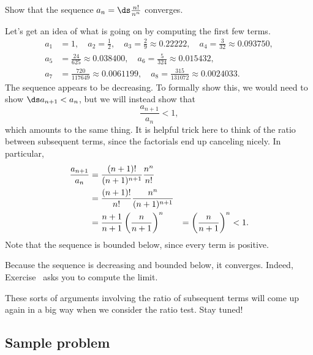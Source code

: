 \documentclass{ximera}
\begin{document}
\begin{example}
Show that the sequence $a_n = \ds\frac{n!}{n^n}$ converges.
\end{example}

\begin{solution}
  Let's get an idea of what is going on by computing the first few terms.
\begin{align*}
a_1&= 1,\quad a_2= \frac{1}{2},\quad a_3= \frac{2}{9} \approx 0.22222,\quad a_4= \frac{3}{32} \approx 0.093750, \\
a_5&= \frac{24}{625} \approx 0.038400, \quad a_6= \frac{5}{324} \approx 0.015432, \\
a_7&= \frac{720}{117649} \approx 0.0061199,\quad a_8= \frac{315}{131072} \approx 0.0024033.
\end{align*}
  The sequence appears to be decreasing.  To formally show this, we would need to show $\ds a_{n+1}< a_n$, but we will instead show that
$$
\frac{a_{n+1}}{a_n} < 1,
$$
which amounts to the same thing.  It is helpful trick here to think of
the ratio between subsequent terms, since the factorials end up
canceling nicely.  In particular,
\begin{align*}
  {a_{n+1}\over a_n} &= {(n+1)!\over (n+1)^{n+1}}{n^n\over n!} \\
  &= {(n+1)!\over n!}{n^n\over (n+1)^{n+1}} \\
  &= {n+1\over n+1}\left({n\over n+1}\right)^n
  &= \left({n\over n+1}\right)^n < 1.
\end{align*}
  Note that the sequence is bounded below, since every term is positive.

  Because the sequence is decreasing and bounded below, it converges.
  Indeed, Exercise~ asks you to
  compute the limit.
\end{solution}

These sorts of arguments involving the ratio of subsequent terms will
come up again in a big way when we consider the ratio test.  Stay
tuned!

\subsection{Sample problem}
\end{document}
